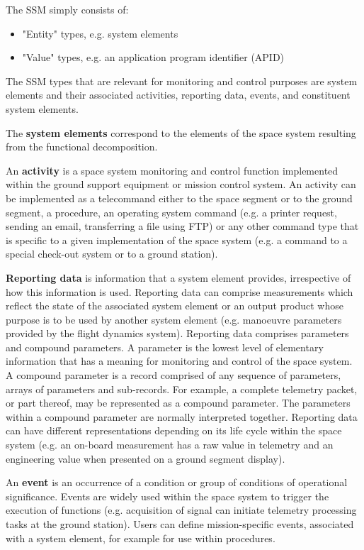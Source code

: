 The SSM simply consists of:
\begin{itemize}
\item "Entity" types, e.g. system elements
\item "Value" types, e.g. an application program identifier (APID)
\end{itemize}

The SSM types that are relevant for monitoring and control purposes are system elements and their associated activities, reporting data, events, and constituent system elements.

The \textbf{system elements} correspond to the elements of the space system resulting from the functional decomposition.

An \textbf{activity} is a space system monitoring and control function implemented within the ground support equipment or mission control system. An activity can be implemented as a telecommand either to the space segment or to the ground segment, a procedure, an operating system command (e.g. a printer request, sending an email, transferring a file using FTP) or any other command type that is specific to a given implementation of the space system (e.g. a command to a special check-out system or to a ground station).

\textbf{Reporting data} is information that a system element provides, irrespective of how this information is used. Reporting data can comprise measurements which reflect the state of the associated system element or an output product whose purpose is to be used by another system element (e.g. manoeuvre parameters provided by the flight dynamics system). Reporting data comprises parameters and compound parameters. A parameter is the lowest level of elementary information that has a meaning for monitoring and control of the space system. A compound parameter is a record comprised of any sequence of parameters, arrays of parameters and sub-records. For example, a complete telemetry packet, or part thereof, may be represented as a compound parameter. The parameters within a compound parameter are normally interpreted together. Reporting data can have different representations depending on its life cycle within the space system (e.g. an on-board measurement has a raw value in telemetry and an engineering value when presented on a ground segment display).

An \textbf{event} is an occurrence of a condition or group of conditions of operational significance. Events are widely used within the space system to trigger the execution of functions (e.g. acquisition of signal can initiate telemetry processing tasks at the ground station). Users can define mission-specific events, associated with a system element, for example for use within procedures.

